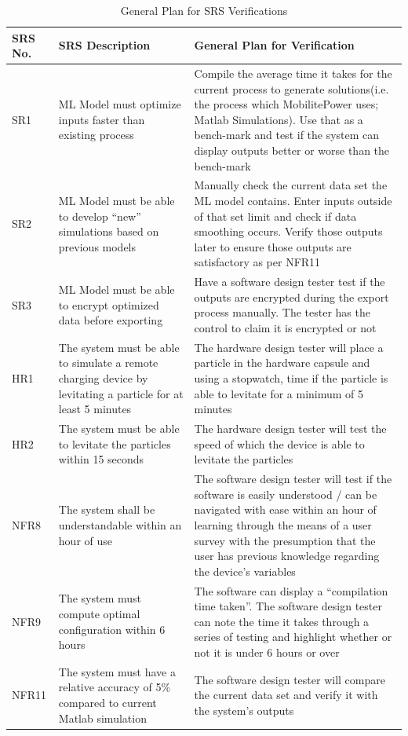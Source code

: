 \documentclass[12pt, titlepage]{article}
\begin{document}
\begin{center}
\begin{table}[H]
    \centering
    \begin{tabular}{|p{2cm}|p{5cm}|p{7cm}|}
    \hline
    SRS No. & SRS Description & General Plan for Verification\\
    \hline
    SR1 & ML Model must optimize inputs faster than existing process & Compile the average time it takes for the current process to generate solutions(i.e. the process which MobilitePower uses; Matlab Simulations). Use that as a bench-mark and test if the system can display outputs better or worse than the bench-mark\\
    \hline
    SR2 & ML Model must be able to develop “new” simulations based on previous models & Manually check the current data set the ML model contains. Enter inputs outside of that set limit and check if data smoothing occurs. Verify those outputs later to ensure those outputs are satisfactory as per NFR11\\
    \hline
    SR3 & ML Model must be able to encrypt optimized data before exporting & Have a software design tester test if the outputs are encrypted during the export process manually. The tester has the control to claim it is encrypted or not\\
    \hline
    HR1 & The system must be able to simulate a remote charging device by levitating a particle for at least 5 minutes & The hardware design tester will place a particle in the hardware capsule and using a stopwatch, time if the particle is able to levitate for a minimum of 5 minutes\\
    \hline
    HR2 & The system must be able to levitate the particles within 15 seconds & The hardware design tester will test the speed of which the device is able to levitate the particles\\
    \hline
    NFR8 & The system shall be understandable within an hour of use & The software design tester will test if the software is easily understood / can be navigated with ease within an hour of learning through the means of a user survey with the presumption that the user has previous knowledge regarding the device's variables\\
    \hline
    NFR9 & The system must compute optimal configuration within 6 hours & The software can display a “compilation time taken”. The software design tester can note the time it takes through a series of testing and highlight whether or not it is under 6 hours or over\\
    \hline
    NFR11 & The system must have a relative accuracy of 5\% compared to current Matlab simulation & The software design tester will compare the current data set and verify it with the system’s outputs\\
    \hline
    \end{tabular}
    \caption{General Plan for SRS Verifications}
    \label{tab:my_label}
\end{table}
\end{center}
\end{document}
